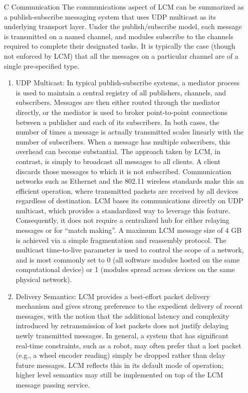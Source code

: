 \begin{itemize}
	\item[C] Communication
	The communications aspect of LCM can be summarized as a publish-subscribe messaging system that uses UDP multicast as its underlying transport layer. Under the publish/subscribe model, each message is transmitted on a named channel, and modules subscribe to the channels required to complete their designated tasks. It is typically the case (though not enforced by LCM) that all the messages on a particular channel are of a single pre-specified type.
		\begin{enumerate}
		\item 
		UDP Multicast: In typical publish-subscribe systems, a mediator process is used to maintain a central registry of all publishers, channels, and subscribers. Messages are then either routed through the mediator directly, or the mediator is used to broker point-to-point connections between a publisher and each of its subscribers. In both cases, the number of times a message is actually transmitted scales linearly with the number of subscribers. When a message has multiple subscribers, this overhead can become substantial. The approach taken by LCM, in contrast, is simply to broadcast all messages to all clients. A client discards those messages to which it is not subscribed. Communication networks such as Ethernet and the 802.11 wireless standards make this an efficient operation, where transmitted packets are received by all devices regardless of destination.
		LCM bases its communications directly on UDP multicast, which provides a standardized way to leverage this feature. Consequently, it does not require a centralized hub for either relaying messages or for “match making”. A maximum LCM message size of 4 GB is achieved via a simple fragmentation and reassembly protocol. The multicast time-to-live parameter is used to control the scope of a network, and is most commonly set to 0 (all software modules hosted on the same computational device) or 1 (modules spread across devices on the same physical network). 
		\item
		Delivery Semantics: LCM provides a best-effort packet delivery mechanism and gives strong preference to the expedient delivery of recent messages, with the notion that the additional latency and complexity introduced by retransmission of lost packets does not justify delaying newly transmitted messages.
		In general, a system that has significant real-time constraints, such as a robot, may often prefer that a lost packet (e.g., a wheel encoder reading) simply be dropped rather than delay future messages. LCM reflects this in its default mode of operation; higher level semantics may still be implemented on top of the LCM message passing service.
		\end{enumerate}
	\end{itemize}


